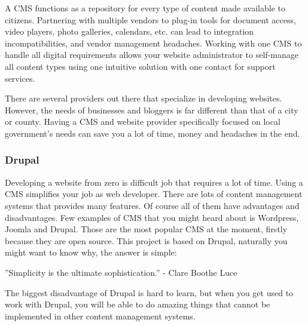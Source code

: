 A CMS functions as a repository for every type of content made available to citizens. Partnering with multiple vendors to plug-in tools for document access, video players, photo galleries, calendars, etc. can lead to integration incompatibilities, and vendor management headaches. Working with one CMS to handle all digital requirements allows your website administrator to self-manage all content types using one intuitive solution with one contact for support services.

There are several providers out there that specialize in developing websites. However, the needs of businesses and bloggers is far different than that of a city or county. Having a CMS and website provider specifically focused on local government’s needs can save you a lot of time, money and headaches in the end.

\subsubsection{Drupal}
Developing a website from zero is difficult job that requires a lot of time. Using a CMS simplifies your job as web developer. There are lots of content management systems that provides many features. Of course all of them have advantages and disadvantages. Few examples of CMS that you might heard about is Wordpress, Joomla and Drupal. Those are the most popular CMS at the moment, firstly because they are open source. This project is based on Drupal, naturally you might want to know why, the answer is simple:

''Simplicity is the ultimate sophistication.''
- Clare Boothe Luce

The biggest disadvantage of Drupal is hard to learn, but when you get used to work with Drupal, you will be able to do amazing things that cannot be implemented in other content management systems.

